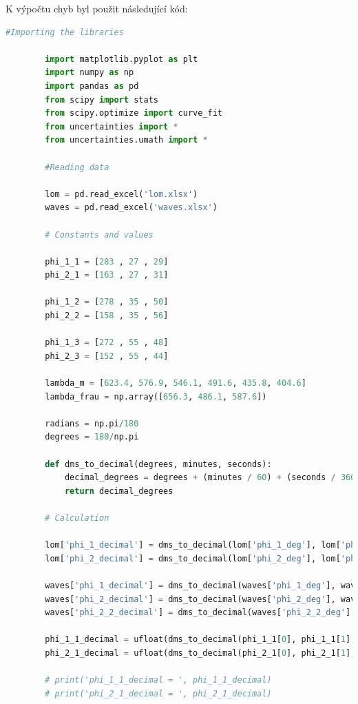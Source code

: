 \documentclass[a4paper,11pt]{article}
\begin{document}
\newpage
    \par K výpočtu chyb byl použit následující kód: 
    \begin{lstlisting}[language=Python, basicstyle=\tiny, breaklines=true]
        #Importing the libraries

        import matplotlib.pyplot as plt
        import numpy as np
        import pandas as pd
        from scipy import stats
        from scipy.optimize import curve_fit
        from uncertainties import *
        from uncertainties.umath import *

        #Reading data

        lom = pd.read_excel('lom.xlsx')
        waves = pd.read_excel('waves.xlsx')

        # Constants and values

        phi_1_1 = [283 , 27 , 29]
        phi_2_1 = [163 , 27 , 31]
        
        phi_1_2	= [278 , 35 , 50]
        phi_2_2 = [158 , 35 , 56]
        
        phi_1_3	= [272 , 55 , 48]
        phi_2_3 = [152 , 55 , 44]
        
        lambda_m = [623.4, 576.9, 546.1, 491.6, 435.8, 404.6]
        lambda_frau = np.array([656.3, 486.1, 587.6])
        
        radians = np.pi/180
        degrees = 180/np.pi

        def dms_to_decimal(degrees, minutes, seconds):
            decimal_degrees = degrees + (minutes / 60) + (seconds / 3600)
            return decimal_degrees

        # Calculation 

        lom['phi_1_decimal'] = dms_to_decimal(lom['phi_1_deg'], lom['phi_1_min'], lom['phi_1_sec'])
        lom['phi_2_decimal'] = dms_to_decimal(lom['phi_2_deg'], lom['phi_2_min'], lom['phi_2_sec'])
        
        waves['phi_1_decimal'] = dms_to_decimal(waves['phi_1_deg'], waves['phi_1_min'], waves['phi_1_sec'])
        waves['phi_2_decimal'] = dms_to_decimal(waves['phi_2_deg'], waves['phi_2_min'], waves['phi_2_sec'])
        waves['phi_2_2_decimal'] = dms_to_decimal(waves['phi_2_2_deg'], waves['phi_2_2_min'], waves['phi_2_2_sec'])
        
        phi_1_1_decimal = ufloat(dms_to_decimal(phi_1_1[0], phi_1_1[1], phi_1_1[2]), 0.000277778)
        phi_2_1_decimal = ufloat(dms_to_decimal(phi_2_1[0], phi_2_1[1], phi_2_1[2]), 0.000277778)
        
        # print('phi_1_1_decimal = ', phi_1_1_decimal)
        # print('phi_2_1_decimal = ', phi_2_1_decimal)
        

\end{lstlisting}
\end{document}
